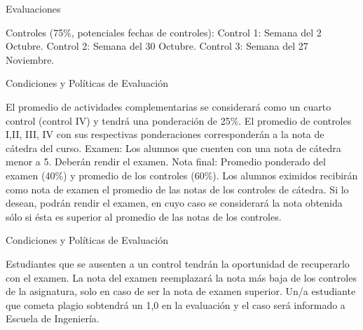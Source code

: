 \documentclass{beamer}
\begin{document}
  \begin{frame}{Evaluaciones}
  \begin{outline}
  	
  	\1 Controles (75\%, potenciales fechas de controles):
	\2 Control 1:  Semana del 2 Octubre.
	\2 Control 2:  Semana del 30 Octubre.
	\2 Control 3:  Semana del 27 Noviembre.

	
  \end{outline}
  \end{frame}
  
  \begin{frame}{Condiciones y Políticas de Evaluación}
  \small
  \begin{outline}
   \1 El promedio de actividades complementarias se considerará como un cuarto control (control IV) y tendrá una ponderación de 25\%. El promedio de controles I,II, III, IV con sus respectivas ponderaciones corresponderán a la nota de cátedra del curso. 
   \1  Examen:  Los alumnos que cuenten con una nota de cátedra menor a 5. Deberán rendir el examen.
   \1 Nota final: Promedio ponderado del examen (40\%) y promedio de los controles (60\%). 
    \1 Los alumnos eximidos recibirán como nota de examen el promedio de las notas de los controles de cátedra. Si lo desean, podrán rendir el examen, en cuyo caso se considerará la nota obtenida sólo si ésta es superior al promedio de las notas de los controles.
  \end{outline}
  \end{frame}
  
  \begin{frame}{Condiciones y Políticas de Evaluación}
  \small
  \begin{outline}      
   \1 Estudiantes que se ausenten a un control tendrán la oportunidad de recuperarlo con el examen. La nota del examen reemplazará la nota más baja de los controles de la asignatura, solo en caso de ser la nota de examen superior.
     \1 Un/a estudiante que cometa plagio sobtendrá un 1,0 en la evaluación y el caso será informado a Escuela de Ingeniería.
  \end{outline}
  \end{frame}
\end{document}
